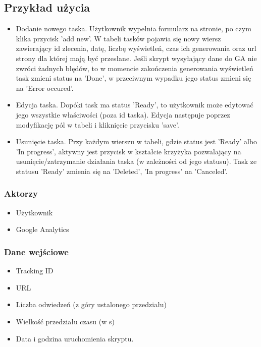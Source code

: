 \documentclass{article}
\begin{document}
\subsection{Przykład użycia}
\begin{itemize}
\item Dodanie nowego taska. Użytkownik wypełnia formularz na stronie, po czym klika przycisk 'add new'. W tabeli tasków pojawia się nowy wiersz zawierający
    id zlecenia, datę, liczbę wyświetleń, czas ich generowania oraz url strony dla której mają być przesłane. Jeśli skrypt wysyłający dane do GA nie zwróci żadnych błędów, to w momencie zakończenia generowania wyświetleń task zmieni status na 'Done', w przeciwnym wypadku jego status zmieni się na 'Error occured'.
\item Edycja taska. Dopóki task ma status 'Ready', to użytkownik może edytować jego wszystkie właściwości (poza id taska). Edycja następuje poprzez modyfikację pól w tabeli i kliknięcie przycisku 'save'.
\item Usunięcie taska. Przy każdym wierszu w tabeli, gdzie status jest 'Ready' albo 'In progress', aktywny jest przycisk w kształcie krzyżyka pozwalający na usunięcie/zatrzymanie działania taska (w zależności od jego statusu). Task ze statusu 'Ready' zmienia się na 'Deleted', 'In progress' na 'Canceled'.
\end{itemize}

\subsubsection{Aktorzy}
\begin{itemize}
\item Użytkownik
\item Google Analytics
\end{itemize}

\subsubsection{Dane wejściowe}
\begin{itemize}
\item Tracking ID
\item URL
\item Liczba odwiedzeń (z góry ustalonego przedziału)
\item Wielkość przedziału czasu (w s)
\item Data i godzina uruchomienia skryptu.
\end{itemize}
\end{document}
